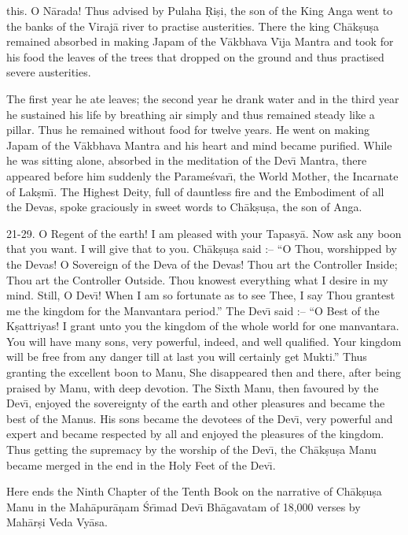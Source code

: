 this. O N\=arada! Thus advised by Pulaha \d{R}i\d{s}i, the son of the King Anga went to the banks of the Viraj\=a river to practise austerities. There the king Ch\=ak\d{s}u\d{s}a remained absorbed in making Japam of the V\=akbhava V\={\i}ja Mantra and took for his food the leaves of the trees that dropped on the ground and thus practised severe austerities.

The first year he ate leaves; the second year he drank water and in the third year he sustained his life by breathing air simply and thus remained steady like a pillar. Thus he remained without food for twelve years. He went on making Japam of the V\=akbhava Mantra and his heart and mind became purified. While he was sitting alone, absorbed in the meditation of the Dev\={\i} Mantra, there appeared before him suddenly the Parame\'svar\={\i}, the World Mother, the Incarnate of Lak\d{s}m\={\i}. The Highest Deity, full of dauntless fire and the Embodiment of all the Devas, spoke graciously in sweet words to Ch\=ak\d{s}u\d{s}a, the son of Anga.

21-29. O Regent of the earth! I am pleased with your Tapasy\=a. Now ask any boon that you want. I will give that to you. Ch\=ak\d{s}u\d{s}a said :-- ``O Thou, worshipped by the Devas! O Sovereign of the Deva of the Devas! Thou art the Controller Inside; Thou art the Controller Outside. Thou knowest everything what I desire in my mind. Still, O Dev\={\i}! When I am so fortunate as to see Thee, I say Thou grantest me the kingdom for the Manvantara period.'' The Dev\={\i} said :-- ``O Best of the K\d{s}attriyas! I grant unto you the kingdom of the whole world for one manvantara. You will have many sons, very powerful, indeed, and well qualified. Your kingdom will be free from any danger till at last you will certainly get Mukti.'' Thus granting the excellent boon to Manu, She disappeared then and there, after being praised by Manu, with deep devotion. The Sixth Manu, then favoured by the Dev\={\i}, enjoyed the sovereignty of the earth and other pleasures and became the best of the Manus. His sons became the devotees of the Dev\={\i}, very powerful and expert and became respected by all and enjoyed the pleasures of the kingdom. Thus getting the supremacy by the worship of the Dev\={\i}, the Ch\=ak\d{s}u\d{s}a Manu became merged in the end in the Holy Feet of the Dev\={\i}.

Here ends the Ninth Chapter of the Tenth Book on the narrative of Ch\=ak\d{s}u\d{s}a Manu in the Mah\=apur\=a\d{n}am \'Sr\={\i}mad Dev\={\i} Bh\=agavatam of 18,000 verses by Mah\=ar\d{s}i Veda Vy\=asa.



